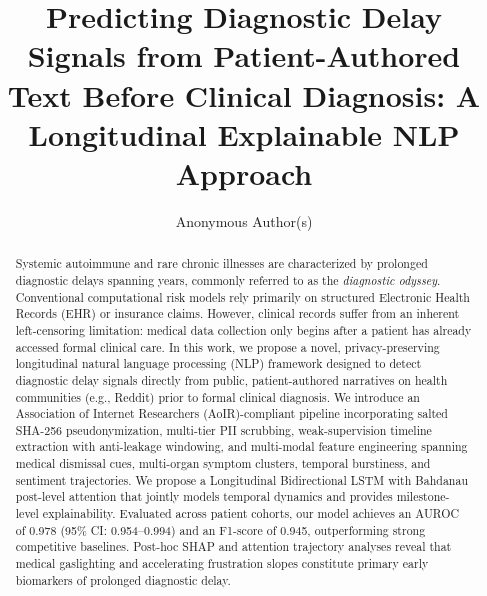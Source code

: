 \documentclass[runningheads]{llncs}
\begin{document}
\title{Predicting Diagnostic Delay Signals from Patient-Authored Text Before Clinical Diagnosis: A Longitudinal Explainable NLP Approach}


\author{Anonymous Author(s)}

\maketitle

\begin{abstract}
Systemic autoimmune and rare chronic illnesses are characterized by prolonged diagnostic delays spanning years, commonly referred to as the \emph{diagnostic odyssey}. Conventional computational risk models rely primarily on structured Electronic Health Records (EHR) or insurance claims. However, clinical records suffer from an inherent left-censoring limitation: medical data collection only begins after a patient has already accessed formal clinical care. In this work, we propose a novel, privacy-preserving longitudinal natural language processing (NLP) framework designed to detect diagnostic delay signals directly from public, patient-authored narratives on health communities (e.g., Reddit) prior to formal clinical diagnosis. We introduce an Association of Internet Researchers (AoIR)-compliant pipeline incorporating salted SHA-256 pseudonymization, multi-tier PII scrubbing, weak-supervision timeline extraction with anti-leakage windowing, and multi-modal feature engineering spanning medical dismissal cues, multi-organ symptom clusters, temporal burstiness, and sentiment trajectories. We propose a Longitudinal Bidirectional LSTM with Bahdanau post-level attention that jointly models temporal dynamics and provides milestone-level explainability. Evaluated across patient cohorts, our model achieves an AUROC of 0.978 (95\% CI: 0.954--0.994) and an F1-score of 0.945, outperforming strong competitive baselines. Post-hoc SHAP and attention trajectory analyses reveal that medical gaslighting and accelerating frustration slopes constitute primary early biomarkers of prolonged diagnostic delay.

\end{abstract}
\end{document}

